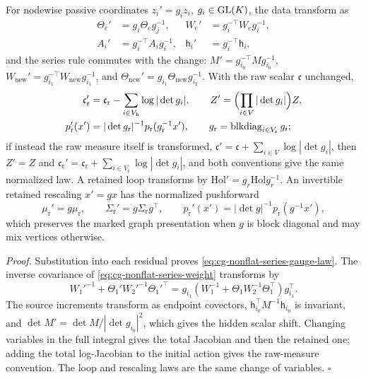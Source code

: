 For nodewise passive coordinates \(z_i'=g_iz_i\), \(g_i\in\mathrm{GL}(K)\), the data
transform as
\begin{equation}
\begin{aligned}
\Theta_e'&=g_i\Theta_eg_j^{-1},&
W_e'&=g_i^{-\top}W_eg_i^{-1},\\
A_i'&=g_i^{-\top}A_ig_i^{-1},&
\mathsf h_i'&=g_i^{-\top}\mathsf h_i,
\end{aligned}
\label{eq:cg-nonflat-series-gauge-law}
\end{equation}
and the series rule commutes with the change:
\(M'=g_{i_0}^{-\top}Mg_{i_0}^{-1}\),
\(W_{\mathrm{new}}'=g_{i_1}^{-\top}W_{\mathrm{new}}g_{i_1}^{-1}\), and
\(\Theta_{\mathrm{new}}'=g_{i_1}\Theta_{\mathrm{new}}g_{i_2}^{-1}\). With the raw
scalar \(\mathfrak c\) unchanged,
\begin{equation}
\begin{aligned}
\mathfrak c_{\mathrm r}'
 &=\mathfrak c_{\mathrm r}-\sum_{i\in V_{\mathrm h}}\log|\det g_i|,\qquad
Z'=\Bigl(\prod_{i\in V}|\det g_i|\Bigr)Z,\\
p_{\mathrm r}'(x')&=|\det g_{\mathrm r}|^{-1}p_{\mathrm r}(g_{\mathrm r}^{-1}x'),
\qquad g_{\mathrm r}=\operatorname{blkdiag}_{i\in V_{\mathrm r}}g_i ;
\end{aligned}
\label{eq:cg-nonflat-series-jacobians}
\end{equation}
if instead the raw measure itself is transformed,
\(\mathfrak c'=\mathfrak c+\sum_{i\in V}\log|\det g_i|\), then \(Z'=Z\) and
\(\mathfrak c_{\mathrm r}'=\mathfrak c_{\mathrm r}+\sum_{i\in V_{\mathrm r}}\log|\det g_i|\),
and both conventions give the same normalized law. A retained loop transforms
by \(\mathrm{Hol}'=g_r\mathrm{Hol}g_r^{-1}\). An invertible retained rescaling
\(x'=gx\) has the normalized pushforward
\begin{equation}
\mu_{\mathrm r}'=g\mu_{\mathrm r},\qquad \Sigma_{\mathrm r}'=g\Sigma_{\mathrm r}g^\top,\qquad
p_{\mathrm r}'(x')=|\det g|^{-1}p_{\mathrm r}(g^{-1}x'),
\label{eq:cg-nonflat-series-rescaling}
\end{equation}
which preserves the marked graph presentation when \(g\) is block diagonal and
may mix vertices otherwise. 

\noindent\emph{Proof.}
Substitution into each residual proves \eqref{eq:cg-nonflat-series-gauge-law}.
The inverse covariance of \eqref{eq:cg-nonflat-series-weight} transforms by
\begin{equation}
W_1'^{-1}+\Theta_1'W_2'^{-1}\Theta_1'^\top
=g_{i_1}(W_1^{-1}+\Theta_1W_2^{-1}\Theta_1^\top)g_{i_1}^\top .
\label{eq:cg-nonflat-series-covariance-gauge}
\end{equation}
The source increments transform as endpoint covectors,
\(\mathsf h_{i_0}^\top M^{-1}\mathsf h_{i_0}\) is invariant, and
\(\det M'=\det M/|\det g_{i_0}|^2\), which gives the hidden scalar shift.
Changing variables in the full integral gives the total Jacobian and then the
retained one; adding the total log-Jacobian to the initial action gives the
raw-measure convention. The loop and rescaling laws are the same change of
variables. \(\square\)

